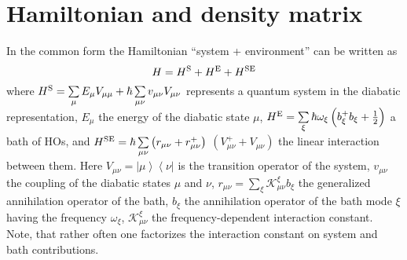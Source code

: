 \documentclass[12pt,twoside,a4paper]{report}
\begin{document}
\section{Hamiltonian and density matrix}\label{Ham}
In the common form the Hamiltonian ``system + environment''
can be written as
 \begin{equation} 
H=H^{\rm S}+H^{\rm E}+H^{\rm SE}
\label{common-Hamiltonian}
\end{equation} 
where  
$H^{\rm S} 
       =
             \sum\limits_\mu 
                       E_\mu V_{\mu \mu } 
           + \hbar 
             \sum\limits_{\mu \nu }
                       v_{\mu \nu }V_{\mu \nu } 
$
represents a quantum system in the diabatic representation,
$E_\mu$ the energy of the diabatic state $\mu$,
$H^{\rm E} 
       =   
             \sum\limits_\xi 
                       \hbar \omega _\xi 
                       \left( 
                           b_\xi ^{+}b_\xi +\frac 12
                       \right) 
$ 
a  bath of HOs, and
$H^{\rm SE} 
       =
             \hbar \sum\limits_{\mu \nu }
                       \left( 
                           r_{\mu \nu }+r_{\mu \nu }^{+}
                       \right) 
$
$
                       \left(
                           V^+_{\mu \nu}
                         +
                           V  _{\mu \nu}
                       \right)$  
the linear interaction between them. 
Here
$V_{\mu \nu }
               = 
                   \left|       \mu \right\rangle 
                   \left\langle \nu        \right| $ 
is the transition operator of the system,
$v_{\mu \nu}$ the coupling of the diabatic states $\mu$ and $\nu$,
$r_{\mu \nu }
               =
                   \sum\limits_\xi 
                       \mathcal{K}_{\mu \nu }^\xi b_\xi $ 
the generalized annihilation operator of the  bath,
$b_\xi $ 
the annihilation operator of the bath mode $\xi $
having the frequency $\omega_\xi$,
$\mathcal{K}
          _{\mu \nu }
          ^\xi       $ 
the frequency-dependent interaction constant. 
Note, that rather often one factorizes 
the interaction constant on system and bath contributions.
  
\end{document}
